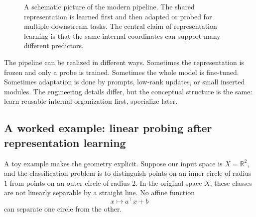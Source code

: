 \begin{figure}[h]
\centering
{}
\caption{A schematic picture of the modern pipeline.
The shared representation is learned first and then adapted or probed for multiple downstream tasks.
The central claim of representation learning is that the same internal coordinates can support many different predictors.}
\end{figure}

The pipeline can be realized in different ways.
Sometimes the representation is frozen and only a probe is trained.
Sometimes the whole model is fine-tuned.
Sometimes adaptation is done by prompts, low-rank updates, or small inserted modules.
The engineering details differ, but the conceptual structure is the same:
learn reusable internal organization first, specialize later.

\subsection*{A worked example: linear probing after representation learning}

A toy example makes the geometry explicit.
Suppose our input space is \(X = \mathbb{R}^2\), and the classification problem is to distinguish points on an inner circle of radius \(1\) from points on an outer circle of radius \(2\).
In the original space \(X\), these classes are not linearly separable by a straight line.
No affine function
\[
x \mapsto a^{\top}x + b
\]
can separate one circle from the other.

